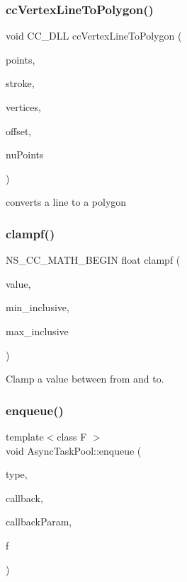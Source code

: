 \subsubsection{\texorpdfstring{cc\+Vertex\+Line\+To\+Polygon()}{ccVertexLineToPolygon()}}
{\footnotesize\ttfamily void C\+C\+\_\+\+D\+LL cc\+Vertex\+Line\+To\+Polygon (\begin{DoxyParamCaption}\item[{\hyperlink{classVec2}{Vec2} $\ast$}]{points,  }\item[{float}]{stroke,  }\item[{\hyperlink{classVec2}{Vec2} $\ast$}]{vertices,  }\item[{unsigned int}]{offset,  }\item[{unsigned int}]{nu\+Points }\end{DoxyParamCaption})}

converts a line to a polygon \mbox{\label{group__base_ga144f0e8ddc73ae5f846ff7af2b2b1466}} 
\subsubsection{\texorpdfstring{clampf()}{clampf()}}
{\footnotesize\ttfamily N\+S\+\_\+\+C\+C\+\_\+\+M\+A\+T\+H\+\_\+\+B\+E\+G\+IN float clampf (\begin{DoxyParamCaption}\item[{float}]{value,  }\item[{float}]{min\+\_\+inclusive,  }\item[{float}]{max\+\_\+inclusive }\end{DoxyParamCaption})\hspace{0.3cm}{\ttfamily [inline]}}

Clamp a value between from and to. \mbox{\label{group__base_ga0e3628387bd146dc14d59271760a6fe2}} 
\subsubsection{\texorpdfstring{enqueue()}{enqueue()}\hspace{0.1cm}{\footnotesize\ttfamily [1/3]}}
{\footnotesize\ttfamily template$<$class F $>$ \\
void Async\+Task\+Pool\+::enqueue (\begin{DoxyParamCaption}\item[{Async\+Task\+Pool\+::\+Task\+Type}]{type,  }\item[{const Task\+Call\+Back \&}]{callback,  }\item[{void $\ast$}]{callback\+Param,  }\item[{F \&\&}]{f }\end{DoxyParamCaption})\hspace{0.3cm}{\ttfamily [inline]}}

